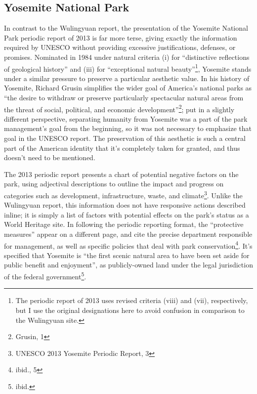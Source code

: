\subsection*{Yosemite National Park}

In contrast to the Wulingyuan report, the presentation of the Yosemite National
Park periodic report of 2013 is far more terse, giving exactly the information
required by UNESCO without providing excessive justifications, defenses, or
promises. Nominated in 1984 under natural criteria (i) for ``distinctive
reflections of geological history'' and (iii) for ``exceptional natural
beauty''\footnote{The periodic report of 2013 uses revised criteria (viii) and
(vii), respectively, but I use the original designations here to avoid confusion
in comparison to the Wulingyuan site.}, Yosemite stands under a similar pressure
to preserve a particular aesthetic value. In his history of Yosemite, Richard
Grusin simplifies the wider goal of America's national parks as ``the desire to
withdraw or preserve particularly spectacular natural areas from the threat of
social, political, and economic development''\footnote{Grusin, 1}; put in a
slightly different perspective, separating humanity from Yosemite was a part of
the park management's goal from the beginning, so it was not necessary to
emphasize that goal in the UNESCO report. The preservation of this aesthetic is
such a central part of the American identity that it's completely taken for
granted, and thus doesn't need to be mentioned.

The 2013 periodic report presents a chart of potential negative factors on the
park, using adjectival descriptions to outline the impact and progress on
categories such as development, infrastructure, waste, and
climate\footnote{UNESCO 2013 Yosemite Periodic Report, 3}. Unlike the Wulingyuan
report, this information does not have responsive actions described inline; it
is simply a list of factors with potential effects on the park's status as a
World Heritage site. In following the periodic reporting format, the
``protective measures'' appear on a different page, and cite the precise
department responsible for management, as well as specific policies that deal
with park conservation\footnote{ibid., 5}. It's specified that Yosemite is ``the
first scenic natural area to have been set aside for public benefit and
enjoyment'', as publicly-owned land under the legal jurisdiction of the federal
government\footnote{ibid.}.

